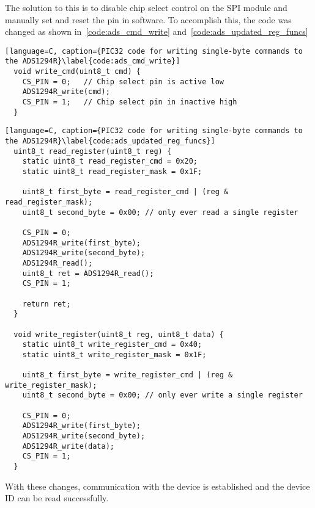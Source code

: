 The solution to this is to disable chip select control on the SPI module and manually set and reset the pin in software.
To accomplish this, the code was changed as shown in~\autoref{code:ads_cmd_write} and~\autoref{code:ads_updated_reg_funcs}

\begin{lstlisting}[language=C, caption={PIC32 code for writing single-byte commands to the ADS1294R}\label{code:ads_cmd_write}]
  void write_cmd(uint8_t cmd) {
    CS_PIN = 0;   // Chip select pin is active low
    ADS1294R_write(cmd);
    CS_PIN = 1;   // Chip select pin in inactive high
  }
\end{lstlisting}


\begin{lstlisting}[language=C, caption={PIC32 code for writing single-byte commands to the ADS1294R}\label{code:ads_updated_reg_funcs}]
  uint8_t read_register(uint8_t reg) {
    static uint8_t read_register_cmd = 0x20;
    static uint8_t read_register_mask = 0x1F;

    uint8_t first_byte = read_register_cmd | (reg & read_register_mask);
    uint8_t second_byte = 0x00; // only ever read a single register

    CS_PIN = 0;
    ADS1294R_write(first_byte);
    ADS1294R_write(second_byte);
    ADS1294R_read();
    uint8_t ret = ADS1294R_read();
    CS_PIN = 1;

    return ret;
  }

  void write_register(uint8_t reg, uint8_t data) {
    static uint8_t write_register_cmd = 0x40;
    static uint8_t write_register_mask = 0x1F;

    uint8_t first_byte = write_register_cmd | (reg & write_register_mask);
    uint8_t second_byte = 0x00; // only ever write a single register

    CS_PIN = 0;
    ADS1294R_write(first_byte);
    ADS1294R_write(second_byte);
    ADS1294R_write(data);
    CS_PIN = 1;
  }
\end{lstlisting}

With these changes, communication with the device is established and the device ID can be read successfully.
